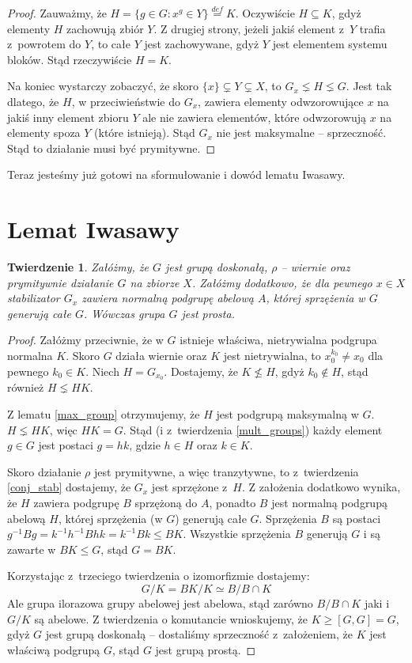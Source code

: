 \documentclass[licencjacka]{pracamgr}
\newtheorem{thh}{Twierdzenie}[section]
\begin{document}
\begin{proof}
Zauważmy, że $H = \{ g \in G \colon x^g \in Y\} \stackrel{def}{=}
K$. Oczywiście $H \subseteq K$, gdyż elementy $H$ zachowują zbiór
$Y$. Z drugiej strony, jeżeli jakiś element z~$Y$ trafia z~powrotem
do $Y$, to całe $Y$ jest zachowywane, gdyż $Y$ jest elementem
systemu bloków. Stąd rzeczywiście $H = K$.

Na koniec wystarczy zobaczyć, że skoro $\{x\} \subsetneq  Y
\subsetneq X$, to $G_x \lneq H \lneq G$. Jest tak dlatego, że $H$, w
przeciwieństwie do $G_x$, zawiera elementy odwzorowujące $x$ na
jakiś inny element zbioru $Y$ ale nie zawiera elementów, które
odwzorowują $x$ na elementy spoza $Y$ (które istnieją). Stąd $G_x$
nie jest maksymalne -- sprzeczność. Stąd to działanie musi być
prymitywne.
\end{proof}

Teraz jesteśmy już gotowi na sformułowanie i dowód lematu Iwasawy.

\section{Lemat Iwasawy}

\begin{thh}
    Załóżmy, że $G$ jest grupą doskonałą, $\rho$ -- wiernie oraz prymitywnie działanie $G$ na zbiorze $X$.
    Załóżmy dodatkowo, że dla pewnego $x \in X$ stabilizator $G_x$ zawiera normalną podgrupę abelową $A$,
    której sprzężenia w $G$ generują całe $G$.
    Wówczas grupa $G$ jest prosta.
\end{thh}
\begin{proof}
    Załóżmy przeciwnie, że w $G$ istnieje właściwa, nietrywialna podgrupa normalna $K$.
    Skoro $G$ działa wiernie oraz $K$ jest nietrywialna, to $x_0^{k_0} \ne x_0$ dla pewnego $k_0 \in K$.
    Niech $H = G_{x_0}$.
    Dostajemy, że $K \nleq H$, gdyż $k_0 \not \in H$, stąd również $H \lneq H K$.

    Z lematu \ref{max_group} otrzymujemy, że $H$ jest podgrupą maksymalną w $G$.
    $H \lneq H K$, więc $H K = G$.
    Stąd (i z~twierdzenia \ref{mult_groups}) każdy element $g \in G$ jest postaci $g = h k$, gdzie $h \in H$ oraz $k \in K$.

    Skoro działanie $\rho$ jest prymitywne, a więc tranzytywne, to z~twierdzenia \ref{conj_stab}
    dostajemy, że $G_x$ jest sprzężone z~$H$.
    Z założenia dodatkowo wynika, że $H$ zawiera podgrupę $B$ sprzężoną do $A$,
    ponadto $B$ jest normalną podgrupą abelową $H$, której sprzężenia (w $G$) generują całe $G$.
    Sprzężenia $B$ są postaci $g^{-1} B g = k^{-1} h^{-1} B h k = k^{-1} B k \le B K$.
    Wszystkie sprzężenia $B$ generują $G$ i są zawarte w $B K \le G$, stąd $G = B K$.

    Korzystając z~trzeciego twierdzenia o izomorfizmie dostajemy:
    $$ G/K = BK/K \simeq B/B\cap K$$
    Ale grupa ilorazowa grupy abelowej jest abelowa, stąd zarówno $B/B\cap K$ jaki i $G/K$ są abelowe.
    Z twierdzenia o komutancie wnioskujemy, że $K \ge [G, G] = G$, gdyż $G$ jest grupą doskonałą --
    dostaliśmy sprzeczność z~założeniem, że $K$ jest właściwą podgrupą $G$, stąd $G$ jest grupą prostą.
\end{proof}
\end{document}
